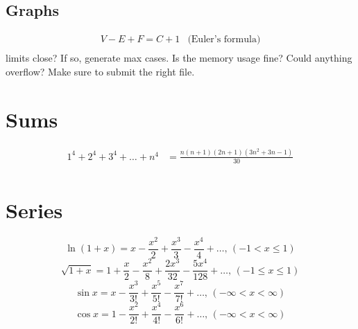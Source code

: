 \subsection{Graphs}
\[\begin{array}{cc}
V - E + F = C + 1 & \text{(Euler's formula)}\\
\end{array}\]limits close? If so, generate max cases.
Is the memory usage fine?
Could anything overflow?
Make sure to submit the right file.


\section{Sums}
\begin{align*}
	1^4 + 2^4 + 3^4 + \dots + n^4 &= \frac{n(n+1)(2n+1)(3n^2 + 3n - 1)}{30} \\
\end{align*}

\section{Series}
$$\ln(1+x) = x-\frac{x^2}{2}+\frac{x^3}{3}-\frac{x^4}{4}+\dots,\,(-1<x\leq1)$$
$$\sqrt{1+x} = 1+\frac{x}{2}-\frac{x^2}{8}+\frac{2x^3}{32}-\frac{5x^4}{128}+\dots,\,(-1\leq x\leq1)$$
$$\sin x = x-\frac{x^3}{3!}+\frac{x^5}{5!}-\frac{x^7}{7!}+\dots,\,(-\infty<x<\infty)$$
$$\cos x = 1-\frac{x^2}{2!}+\frac{x^4}{4!}-\frac{x^6}{6!}+\dots,\,(-\infty<x<\infty)$$
